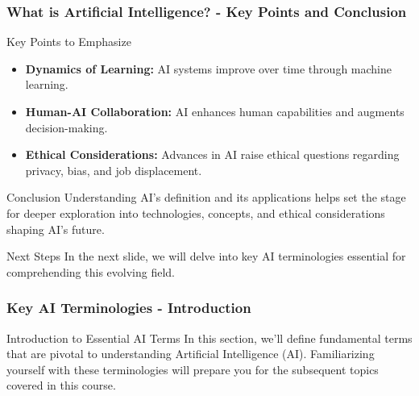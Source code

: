 \documentclass[aspectratio=169]{beamer}
\begin{document}
\begin{frame}[fragile]
    \frametitle{What is Artificial Intelligence? - Key Points and Conclusion}
    \begin{block}{Key Points to Emphasize}
        \begin{itemize}
            \item \textbf{Dynamics of Learning:} AI systems improve over time through machine learning.
            \item \textbf{Human-AI Collaboration:} AI enhances human capabilities and augments decision-making.
            \item \textbf{Ethical Considerations:} Advances in AI raise ethical questions regarding privacy, bias, and job displacement.
        \end{itemize}
    \end{block}
    
    \begin{block}{Conclusion}
        Understanding AI's definition and its applications helps set the stage for deeper exploration into technologies, concepts, and ethical considerations shaping AI's future.
    \end{block}
    \vspace{10pt}
    \begin{block}{Next Steps}
        In the next slide, we will delve into key AI terminologies essential for comprehending this evolving field.
    \end{block}
\end{frame}

\begin{frame}[fragile]
    \frametitle{Key AI Terminologies - Introduction}
    \begin{block}{Introduction to Essential AI Terms}
        In this section, we'll define fundamental terms that are pivotal to understanding Artificial Intelligence (AI). Familiarizing yourself with these terminologies will prepare you for the subsequent topics covered in this course.
    \end{block}
\end{frame}
\end{document}
